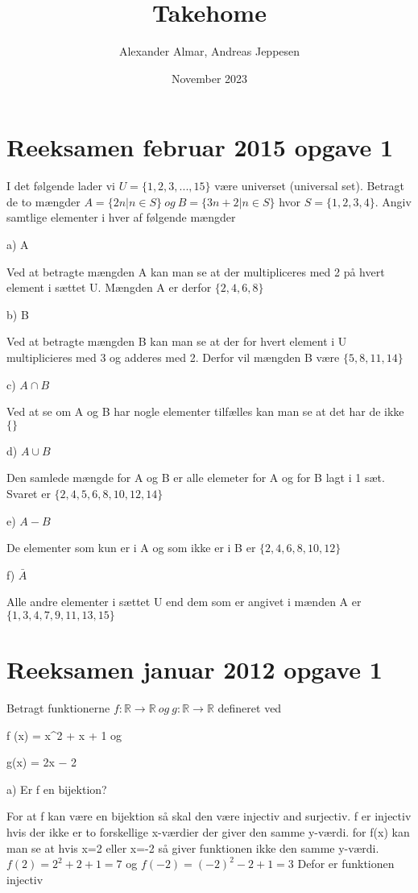 \documentclass{article}
\title{Takehome}
\author{Alexander Almar, Andreas Jeppesen }
\date{November 2023}
\begin{document}
\maketitle

\section{Reeksamen februar 2015 opgave 1}
I det følgende lader vi \(U = \{1, 2, 3, . . . , 15\}\) være universet (universal set). Betragt de to mængder 
\(A = \{2n | n \in S\}\ og\ B = \{3n + 2 | n \in S\}\) hvor \(S = \{1, 2, 3, 4\}\). Angiv samtlige elementer i hver af følgende mængder

a) A

Ved at betragte mængden A kan man se at der multipliceres med 2 på hvert element i sættet U. Mængden A er derfor
\(\{2,4,6,8\}\)

b) B

Ved at betragte mængden B kan man se at der for hvert element i U multiplicieres med 3 og adderes med 2. Derfor vil mængden B være 
\(\{5,8,11,14\}\)

c) \(A \cap B\)

Ved at se om A og B har nogle elementer tilfælles kan man se at det har de ikke 
\(\{\}\)

d) \(A \cup B\)

Den samlede mængde for A og B er alle elemeter for A og for B lagt i 1 sæt. Svaret er 
\(\{2,4,5,6,8,10,12,14\}\)

e) \(A-B\)

De elementer som kun er i A og som ikke er i B er
\(\{2,4,6,8,10,12\}\)

f) \(\bar A \)

Alle andre elementer i sættet U end dem som er angivet i mænden A er 
\(\{1,3,4,7,9,11,13,15\}\)



\section{Reeksamen januar 2012 opgave 1}
Betragt funktionerne \(f : \mathbb{R} \rightarrow \mathbb{R}\ og\ g : \mathbb{R} \rightarrow \mathbb{R}\) defineret ved


f (x) = x^2 + x + 1 og

g(x) = 2x − 2


a) Er f en bijektion?


For at f kan være en bijektion så skal den være injectiv and surjectiv. f er injectiv hvis der ikke er to forskellige x-værdier der giver den samme y-værdi. for f(x) kan man se at hvis x=2 eller x=-2 så giver funktionen ikke den samme y-værdi. 
\(f(2)=2^2+2+1=7\) og \(f(-2)=(-2)^2-2+1=3\)
Defor er funktionen injectiv
\end{document}
